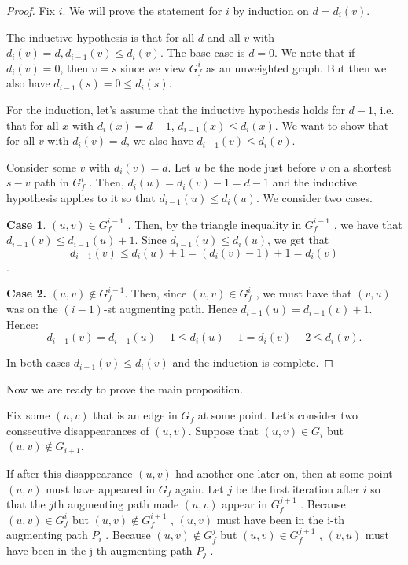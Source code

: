 \documentclass [12pt]{article}
\theoremstyle{definition}
\begin{document}
\begin{proof} 
Fix $i$. We will prove the statement for $i$ by induction on $d = d_i (v )$.

The inductive hypothesis is that for all $d$ and all $v$ with $d_i (v ) = d, d_{i-1}(v ) \leq d_i (v )$. The base case is $d = 0$. We note that if $d_i (v ) = 0$, then $v = s$ since we view $G^i_f$ as an unweighted graph. But then we also have $d_{i-1}(s) = 0 \leq d_i (s)$.

For the induction, let's assume that the inductive hypothesis holds for $d - 1$, i.e. that for all $x$ with $d_i (x) = d - 1$, $d_{i-1}(x) \leq d_i (x)$. We want to show that for all $v$ with $d_i (v ) = d$, we also have $d_{i-1}(v ) \leq d_i (v )$. 

Consider some $v$ with $d_i (v ) = d$. Let $u$ be the node just before $v$ on a shortest $s - v$ path in $G^i_f$ . Then, $d_i (u) = d_i (v ) - 1 = d - 1$ and the inductive hypothesis applies to it so that $d_{i-1}(u) \leq d_i (u)$. We consider two cases. 

\textbf{Case 1}. $(u, v ) \in G^{i-1}_f$ . Then, by the triangle inequality in $G^{i-1}_f$ , we have that $d_{i-1}(v ) \leq d_{i-1}(u) + 1$. Since $d_{i-1}(u) \leq d_i (u)$, we get that 
$$
d_{i-1}(v ) \leq d_i (u) + 1 = (d_i (v ) - 1) + 1 = d_i (v )
$$. 

\textbf{Case 2.} $(u, v ) \notin G^{i-1}_f $. Then, since $(u, v ) \in G^i_f$ , we must have that $(v, u)$ was on the $(i - 1)$-st augmenting path. Hence $d_{i-1}(u) = d_{i-1}(v ) + 1$. Hence: 
$$
d_{i-1}(v ) = d_{i-1}(u) - 1 \leq d_i (u) - 1 = d_i (v ) - 2 \leq d_i (v ).
$$

In both cases $d_{i-1}(v ) \leq d_{i} (v )$ and the induction is complete.
\end{proof}
 
Now we are ready to prove the main proposition.

Fix some $(u, v )$ that is an edge in $G_f$ at some point. Let's consider two consecutive disappearances of $(u, v )$. Suppose that $(u, v ) \in G_i$ but $(u, v ) \notin G_{i+1}$. 

If after this disappearance $(u, v )$ had another one later on, then at some point $(u, v )$ must have appeared in $G_f$ again. Let $j$ be the first iteration after $i$ so that the $j$th augmenting path made $(u, v )$ appear in $G^{j+1}_f$ . Because $(u, v ) \in G^i_f$ but $(u, v ) \notin G^{i+1}_f$ , $(u, v )$ must have been in the i-th augmenting path $P_i$ . Because $(u, v ) \notin G^j_f$ but $(u, v ) \in G^{j+1}_f$ , $(v, u)$ must have been in the j-th augmenting path $P_j$ .
\end{document}
